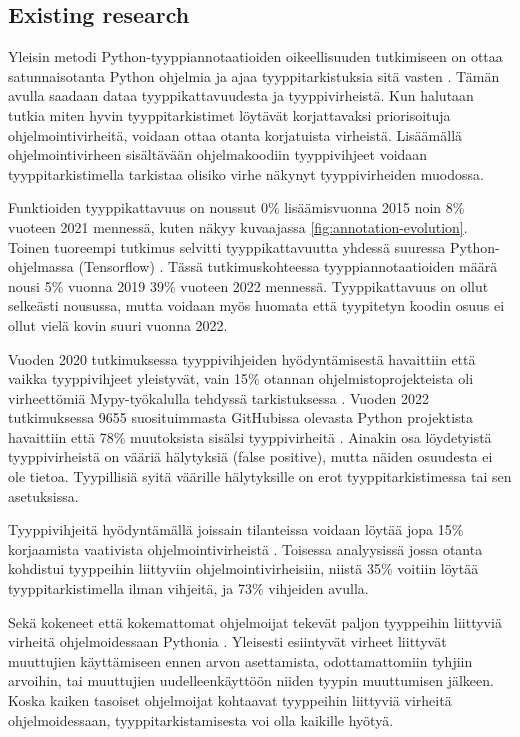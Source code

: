 \begin{otherlanguage}{finnish}
\section*{Existing research}
Yleisin metodi Python-tyyppiannotaatioiden oikeellisuuden tutkimiseen on ottaa satunnaisotanta Python ohjelmia ja ajaa tyyppitarkistuksia sitä vasten \cite{di_grazia_evolution_2022, lin_towards_large_scale_2023, rak-amnouykit_taleoftwo_2020, xu_how_well_static_2023}. Tämän avulla saadaan dataa tyyppikattavuudesta ja tyyppivirheistä. Kun halutaan tutkia miten hyvin tyyppitarkistimet löytävät korjattavaksi priorisoituja ohjelmointivirheitä, voidaan ottaa otanta korjatuista virheistä. Lisäämällä ohjelmointivirheen sisältävään ohjelmakoodiin tyyppivihjeet voidaan tyyppitarkistimella tarkistaa olisiko virhe näkynyt tyyppivirheiden muodossa.

Funktioiden tyyppikattavuus on noussut 0\% lisäämisvuonna 2015 noin 8\% vuoteen 2021 mennessä, kuten näkyy kuvaajassa \ref{fig:annotation-evolution}. Toinen tuoreempi tutkimus selvitti tyyppikattavuutta yhdessä suuressa Python-ohjelmassa (Tensorflow) \cite{lin_towards_large_scale_2023}. Tässä tutkimuskohteessa tyyppiannotaatioiden määrä nousi 5\% vuonna 2019 39\% vuoteen 2022 mennessä. Tyyppikattavuus on ollut selkeästi nousussa, mutta voidaan myös huomata että tyypitetyn koodin osuus ei ollut vielä kovin suuri vuonna 2022.

Vuoden 2020 tutkimuksessa tyyppivihjeiden hyödyntämisestä havaittiin että vaikka tyyppivihjeet yleistyvät, vain 15\% otannan ohjelmistoprojekteista oli virheettömiä Mypy-työkalulla tehdyssä tarkistuksessa \cite{rak-amnouykit_taleoftwo_2020}. Vuoden 2022 tutkimuksessa 9655 suosituimmasta GitHubissa olevasta Python projektista havaittiin että 78\% muutoksista sisälsi tyyppivirheitä \cite{di_grazia_evolution_2022}. Ainakin osa löydetyistä tyyppivirheistä on vääriä hälytyksiä (false positive), mutta näiden osuudesta ei ole tietoa. Tyypillisiä syitä väärille hälytyksille on erot tyyppitarkistimessa tai sen asetuksissa.

Tyyppivihjeitä hyödyntämällä joissain tilanteissa voidaan löytää jopa 15\% korjaamista vaativista ohjelmointivirheistä \cite{khan_empirical_2022}. Toisessa analyysissä jossa otanta kohdistui tyyppeihin liittyviin ohjelmointivirheisiin, niistä 35\% voitiin löytää tyyppitarkistimella ilman vihjeitä, ja 73\% vihjeiden avulla.

Sekä kokeneet että kokemattomat ohjelmoijat tekevät paljon tyyppeihin liittyviä virheitä ohjelmoidessaan Pythonia \cite{khan_empirical_2022}. Yleisesti esiintyvät virheet liittyvät muuttujien käyttämiseen ennen arvon asettamista, odottamattomiin tyhjiin arvoihin, tai muuttujien uudelleenkäyttöön niiden tyypin muuttumisen jälkeen. Koska kaiken tasoiset ohjelmoijat kohtaavat tyyppeihin liittyviä virheitä ohjelmoidessaan, tyyppitarkistamisesta voi olla kaikille hyötyä.


\end{otherlanguage}
